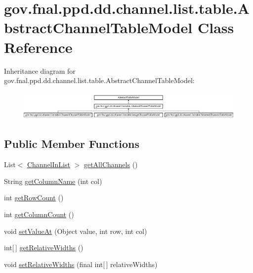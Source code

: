 \hypertarget{classgov_1_1fnal_1_1ppd_1_1dd_1_1channel_1_1list_1_1table_1_1AbstractChannelTableModel}{\section{gov.\-fnal.\-ppd.\-dd.\-channel.\-list.\-table.\-Abstract\-Channel\-Table\-Model Class Reference}
\label{classgov_1_1fnal_1_1ppd_1_1dd_1_1channel_1_1list_1_1table_1_1AbstractChannelTableModel}
}
Inheritance diagram for gov.\-fnal.\-ppd.\-dd.\-channel.\-list.\-table.\-Abstract\-Channel\-Table\-Model\-:\begin{figure}[H]
\begin{center}
\leavevmode
\includegraphics[height=1.473684cm]{classgov_1_1fnal_1_1ppd_1_1dd_1_1channel_1_1list_1_1table_1_1AbstractChannelTableModel}
\end{center}
\end{figure}
\subsection*{Public Member Functions}
\begin{DoxyCompactItemize}
\item 
List$<$ \hyperlink{classgov_1_1fnal_1_1ppd_1_1dd_1_1channel_1_1ChannelInList}{Channel\-In\-List} $>$ \hyperlink{classgov_1_1fnal_1_1ppd_1_1dd_1_1channel_1_1list_1_1table_1_1AbstractChannelTableModel_afdb38b8ef580a39a0cc6020bad6de956}{get\-All\-Channels} ()
\item 
String \hyperlink{classgov_1_1fnal_1_1ppd_1_1dd_1_1channel_1_1list_1_1table_1_1AbstractChannelTableModel_a1ba318cf0852ccb29b988156cb42e606}{get\-Column\-Name} (int col)
\item 
int \hyperlink{classgov_1_1fnal_1_1ppd_1_1dd_1_1channel_1_1list_1_1table_1_1AbstractChannelTableModel_a837bfac700eac04a2f0fad3f4f4d4607}{get\-Row\-Count} ()
\item 
int \hyperlink{classgov_1_1fnal_1_1ppd_1_1dd_1_1channel_1_1list_1_1table_1_1AbstractChannelTableModel_a86dc8c67bd825e26da6cc2c153711c0c}{get\-Column\-Count} ()
\item 
void \hyperlink{classgov_1_1fnal_1_1ppd_1_1dd_1_1channel_1_1list_1_1table_1_1AbstractChannelTableModel_a09b82ae4fdd621b017e38e692e53bf18}{set\-Value\-At} (Object value, int row, int col)
\item 
int\mbox{[}$\,$\mbox{]} \hyperlink{classgov_1_1fnal_1_1ppd_1_1dd_1_1channel_1_1list_1_1table_1_1AbstractChannelTableModel_a0ad344539266c20b6f1bbe88410e9079}{get\-Relative\-Widths} ()
\item 
void \hyperlink{classgov_1_1fnal_1_1ppd_1_1dd_1_1channel_1_1list_1_1table_1_1AbstractChannelTableModel_a54c6bf88f44803aec7e97c6ff71825e3}{set\-Relative\-Widths} (final int\mbox{[}$\,$\mbox{]} relative\-Widths)
\end{DoxyCompactItemize}
